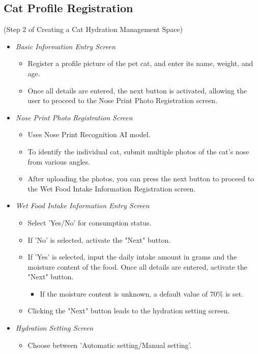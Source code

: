 \documentclass[conference]{IEEEtran}
\begin{document}
\subsection{Cat Profile Registration}
(Step 2 of Creating a Cat Hydration Management Space)
\begin{itemize}
\item{\emph{Basic Information Entry Screen}}
    \begin{itemize}
        \item Register a profile picture of the pet cat, and enter its name, weight, and age.
        \item Once all details are entered, the next button is activated, allowing the user to proceed to the Nose Print Photo Registration screen.
    \end{itemize}
\item{\emph{Nose Print Photo Registration Screen}}
    \begin{itemize}
        \item Uses Nose Print Recognition AI model.
        \item To identify the individual cat, submit multiple photos of the cat's nose from various angles.
        \item After uploading the photos, you can press the next button to proceed to the Wet Food Intake Information Registration screen.
    \end{itemize}
\item{\emph{Wet Food Intake Information Entry Screen}}
    \begin{itemize}
        \item Select 'Yes/No' for consumption status.
        \item If 'No' is selected, activate the "Next" button.
        \item If 'Yes' is selected, input the daily intake amount in grams and the moisture content of the food. Once all details are entered, activate the "Next" button.
        \begin{itemize}
            \item If the moisture content is unknown, a default value of 70\% is set.
        \end{itemize}
        \item Clicking the "Next" button leads to the hydration setting screen.
    \end{itemize}
\item{\emph{Hydration Setting Screen}}
    \begin{itemize}
        \item Choose between 'Automatic setting/Manual setting'.

\end{itemize}
\end{itemize}
\end{document}
